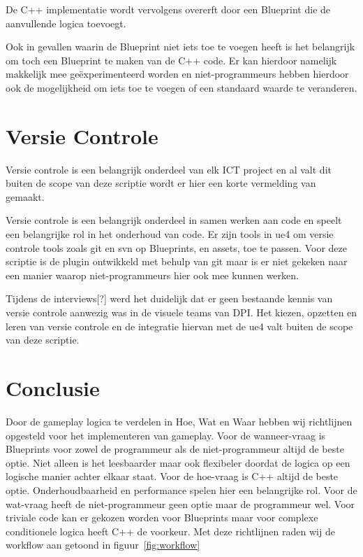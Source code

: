 De C++ implementatie wordt vervolgens overerft door een Blueprint die de aanvullende logica toevoegt.

Ook in gevallen waarin de Blueprint niet iets toe te voegen heeft is het belangrijk om toch een Blueprint te maken van de C++ code. Er kan hierdoor namelijk makkelijk mee geëxperimenteerd worden en niet-programmeurs hebben hierdoor ook de mogelijkheid om iets toe te voegen of een standaard waarde te veranderen.

\section{Versie Controle}
Versie controle is een belangrijk onderdeel van elk ICT project en al valt dit buiten de scope van deze scriptie wordt er hier een korte vermelding van gemaakt.

Versie controle is een belangrijk onderdeel in samen werken aan code en speelt een belangrijke rol in het onderhoud van code. Er zijn tools in \gls{ue4} om versie controle tools zoals git en svn op Blueprints, en assets, toe te passen. Voor deze scriptie is de plugin ontwikkeld met behulp van git maar is er niet gekeken naar een manier waarop niet-programmeurs hier ook mee kunnen werken.

Tijdens de interviews[?] werd het duidelijk dat er geen bestaande kennis van versie controle aanwezig was in de visuele teams van DPI. Het kiezen, opzetten en leren van versie controle en de integratie hiervan met de \gls{ue4} valt buiten de scope van deze scriptie.

\section{Conclusie}
Door de gameplay logica te verdelen in Hoe, Wat en Waar hebben wij richtlijnen opgesteld voor het implementeren van gameplay. Voor de wanneer-vraag is Blueprints voor zowel de programmeur als de niet-programmeur altijd de beste optie. Niet alleen is het leesbaarder maar ook flexibeler doordat de logica op een logische manier achter elkaar staat. Voor de hoe-vraag is C++ altijd de beste optie. Onderhoudbaarheid en performance spelen hier een belangrijke rol. Voor de wat-vraag heeft de niet-programmeur geen optie maar de programmeur wel. Voor triviale code kan er gekozen worden voor Blueprints maar voor complexe conditionele logica heeft C++ de voorkeur. Met deze richtlijnen raden wij de workflow aan getoond in figuur~\ref{fig:workflow}